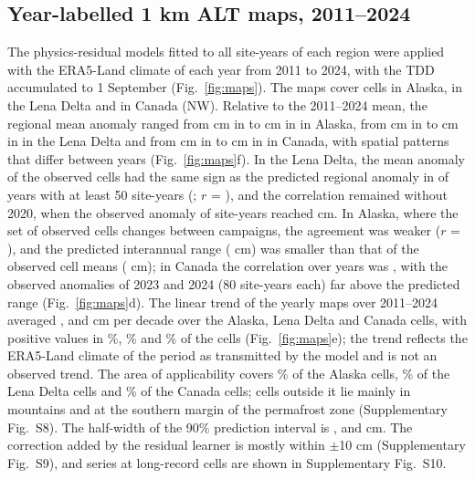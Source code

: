 \subsection{Year-labelled 1 km ALT maps, 2011--2024}
The physics-residual models fitted to all site-years of each region were applied with the ERA5-Land climate of each year from 2011 to 2024, with the TDD accumulated to 1 September (Fig.~\ref{fig:maps}). The maps cover \nncellmapAk{} cells in Alaska, \nncellmapLe{} in the Lena Delta and \nncellmapCa{} in Canada (NW). Relative to the 2011--2024 mean, the regional mean anomaly ranged from \nanminAk{} cm in \nanminyrAk{} to \nanmaxAk{} cm in \nanmaxyrAk{} in Alaska, from \nanminLe{} cm in \nanminyrLe{} to \nanmaxLe{} cm in \nanmaxyrLe{} in the Lena Delta and from \nanminCa{} cm in \nanminyrCa{} to \nanmaxCa{} cm in \nanmaxyrCa{} in Canada, with spatial patterns that differ between years (Fig.~\ref{fig:maps}f). In the Lena Delta, the mean anomaly of the observed cells had the same sign as the predicted regional anomaly in \nanobssameLe{} of \nanobsnLe{} years with at least 50 site-years (\nanobsyrsLe; $r$ = \nanobsrLe), and the correlation remained \nanobsrLeNoTwenty{} without 2020, when the observed anomaly of \nanobsLeTwentyN{} site-years reached \nanobsLeTwentyObs{} cm. In Alaska, where the set of observed cells changes between campaigns, the agreement was weaker ($r$ = \nanobsrAk), and the predicted interannual range (\nanpredrangeAk{} cm) was smaller than that of the observed cell means (\nanobsrangeAk{} cm); in Canada the correlation over \nanobsnCa{} years was \nanobsrCa, with the observed anomalies of 2023 and 2024 (80 site-years each) far above the predicted range (Fig.~\ref{fig:maps}d). The linear trend of the yearly maps over 2011--2024 averaged \ntrendAk{}, \ntrendLe{} and \ntrendCa{} cm per decade over the Alaska, Lena Delta and Canada cells, with positive values in \ntrendposAk\%, \ntrendposLe\% and \ntrendposCa\% of the cells (Fig.~\ref{fig:maps}e); the trend reflects the ERA5-Land climate of the period as transmitted by the model and is not an observed trend. The area of applicability covers \naoaAk\% of the Alaska cells, \naoaLe\% of the Lena Delta cells and \naoaCa\% of the Canada cells; cells outside it lie mainly in mountains and at the southern margin of the permafrost zone (Supplementary Fig.~S8). The half-width of the 90\% prediction interval is \nhwAk{}, \nhwLe{} and \nhwCa{} cm. The correction added by the residual learner is mostly within $\pm$10 cm (Supplementary Fig.~S9), and series at long-record cells are shown in Supplementary Fig.~S10.

